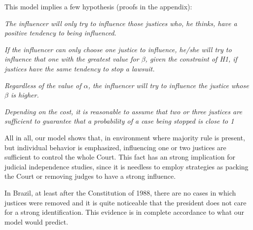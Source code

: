 \documentclass[12pt, a4paper]{article}
\newenvironment{hypothesis}
 {\enumerate[label=\textbf{H\arabic*.}, ref=H\arabic*]}
 {\endenumerate}
\begin{document}
This model implies a few hypothesis (proofs in the appendix): \begin{hypothesis} \item \emph{The influencer will only try to influence those justices who, he thinks, have a positive tendency to being influenced.} \item \emph{If the influencer can only choose one justice to influence, he/she will try to influence that one with the greatest value for $\beta$, given the constraint of H1, if justices have the same tendency to stop a lawsuit. } \item \emph{Regardless of the value of $\alpha$, the influencer will try to influence the justice whose $\beta$ is higher.} \item \emph{Depending on the cost, it is reasonable to assume that two or three justices are sufficient to guarantee that a probability of a case being stopped is close to 1 }  \end{hypothesis}

All in all, our model shows that, in environment where majority rule is present, but individual behavior is emphasized, influencing one or two justices are sufficient to control the whole Court. This fact has an strong implication for judicial independence studies, since it is needless to employ strategies as packing the Court or removing judges to have a strong influence.

In Brazil, at least after the Constitution of 1988, there are no cases in which justices were removed and it is quite noticeable that the president does not care for a strong identification. This evidence is in complete accordance to what our model would predict. 



\end{document}
